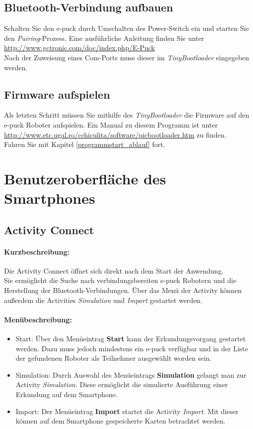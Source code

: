 \documentclass[10pt,a4paper]{article}
\let\oldsection\section
\renewcommand{\section}{\newpage \oldsection}
\begin{document}
			\subsection{Bluetooth-Verbindung aufbauen} 
				Schalten Sie den e-puck durch Umschalten des Power-Switch ein und starten Sie den \textit{Pairing}-Prozess. Eine ausf\"uhrliche Anleitung finden Sie
				unter  \\ \url{http://www.gctronic.com/doc/index.php/E-Puck} \\
				Nach der Zuweisung eines Com-Ports muss dieser im \textit{TinyBootloader} eingegeben werden.			
			\subsection{Firmware aufspielen} 
				Als letzten Schritt m\"ussen Sie mithilfe des \textit{TinyBootloader} die Firmware auf den e-puck Roboter aufspielen. Ein Manual zu diesem Programm
				ist unter \url{http://www.etc.ugal.ro/cchiculita/software/picbootloader.htm} zu finden. \\
				Fahren Sie mit Kapitel \ref{programmstart_ablauf} fort.
\section{Benutzeroberfl\"ache des Smartphones}
	\subsection{Activity Connect}
		\paragraph*{Kurzbeschreibung:}
		Die Activity Connect \"offnet sich direkt nach dem Start der Anwendung. \\	
		Sie ermöglicht die Suche nach verbindungsbereiten e-puck Robotern und die Herstellung der Bluetooth-Verbindungen.
		Über das Men\"u der Activity können außerdem die Activities \textit{Simulation} und \textit{Import} gestartet werden.

		\paragraph*{Menübeschreibung:}
		\begin{itemize}
			\item Start: Über den Men\"ueintrag \textbf{Start} kann der Erkundungsvorgang gestartet werden. Dazu muss jedoch mindestens ein e-puck
			verf\"ugbar und in der Liste der gefundenen Roboter als Teilnehmer ausgew\"ahlt worden sein.
			\item Simulation: Durch Auswahl des Men\"ueintrags \textbf{Simulation} gelangt man zur Activity \textit{Simulation}. Diese erm\"oglicht
			die simulierte Ausf\"uhrung einer Erkundung auf dem Smartphone.
			\item Import: Der Men\"ueintrag \textbf{Import} startet die Activity \textit{Import}. Mit dieser k\"onnen auf dem Smartphone gespeicherte
			Karten betrachtet werden.
		\end{itemize}
\end{document}
